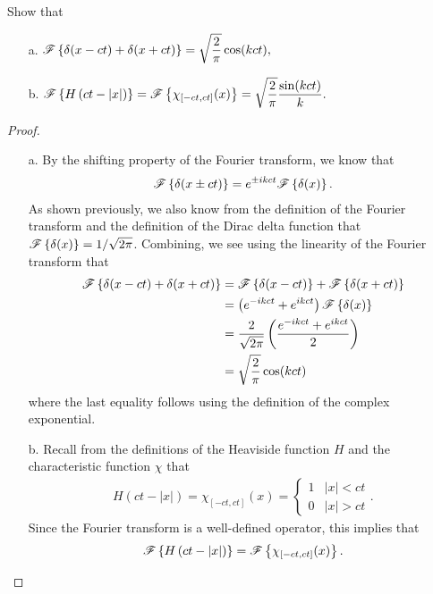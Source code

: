 \begin{problem}{2.2}
  Show that
  \begin{enumerate}
    \item [a.] $\displaystyle \mathscr{F}\left\{ { \delta(x - ct) + \delta(x + ct) } \right\} = \sqrt{ \frac{ 2 }{ \pi} } \cos(kct),$
    \item [b.] $\displaystyle \mathscr{F}\left\{ { H \left( ct - |x| \right) } \right\} = \mathscr{F}\left\{ { \chi_{[-ct, ct]}(x) } \right\}
      = \sqrt{ \frac{ 2 }{ \pi} } \frac{ \sin(kct) }{ k }.$
  \end{enumerate}
\end{problem}

\begin{proof}
  \begin{enumerate}
    \item[a.] By the shifting property of the Fourier transform, we know that
      \begin{align*}
        \mathscr{F}\left\{ {\delta(x \pm ct)} \right\} = e^{\pm ik ct}\mathscr{F}\left\{ {\delta(x)} \right\}.
      \end{align*}
      As shown previously, we also know from the definition of the Fourier transform
      and the definition of the Dirac delta function that $\mathscr{F}\left\{ {\delta(x)} \right\} = 1/\sqrt{2\pi}$. Combining,
      we see using the linearity of the Fourier transform that
      \begin{align*}
        \mathscr{F}\left\{ { \delta(x - ct) + \delta(x + ct) } \right\} &= \mathscr{F}\left\{ { \delta(x - ct)} \right\} + \mathscr{F}\left\{ {\delta(x + ct) } \right\} \\
        &= \left(e^{-ik ct} + e^{ikct} \right)\mathscr{F}\left\{ {\delta(x)} \right\} \\
        &= \frac{2}{\sqrt{2\pi}} \left(\frac{e^{-ik ct} + e^{ikct}}{2}\right) \\
        &= \sqrt{\frac{2}{\pi}}\cos(kct)
      \end{align*}
      where the last equality follows using the definition of the complex exponential.
    \item[b.] Recall from the definitions of the Heaviside function $H$ and
      the characteristic function $\chi$ that
      \begin{align*}
        H(ct - |x|) = \chi_{[-ct, ct]}(x) =
        \begin{cases}
          1 & |x| < ct \\
          0 & |x| > ct
        \end{cases}.
      \end{align*}
      Since the Fourier transform is a well-defined operator, this implies that
      $$\displaystyle \mathscr{F}\left\{ { H \left( ct - |x| \right) } \right\} = \mathscr{F}\left\{ { \chi_{[-ct, ct]}(x) } \right\}.$$


\end{enumerate}
\end{proof}
